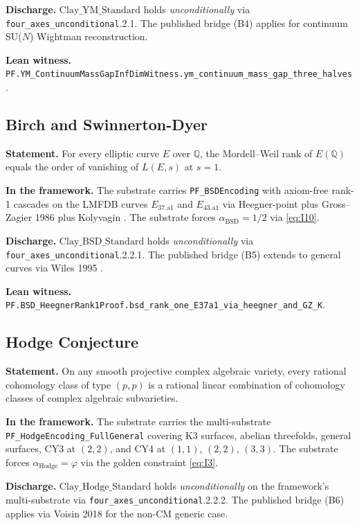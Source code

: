 \documentclass[11pt,a4paper]{article}
\theoremstyle{plain}
\theoremstyle{definition}
\theoremstyle{remark}
\newcommand{\alphaBSD}{\alpha_{\mathrm{BSD}}}
\newcommand{\alphaHodge}{\alpha_{\mathrm{Hodge}}}
\newcommand{\Cstd}[1]{\mathrm{Clay\_#1\_Standard}}
\newcommand{\code}[1]{\texttt{#1}}
\begin{document}
\textbf{Discharge.} $\Cstd{YM}$ holds \emph{unconditionally} via
\code{four\_axes\_unconditional}.2.1. The published bridge (B4)
applies for continuum SU($N$) Wightman reconstruction.

\textbf{Lean witness.}
\code{PF.YM\_ContinuumMassGapInfDimWitness.ym\_continuum\_mass\_gap\_three\_halves}.

\subsection{Birch and Swinnerton-Dyer}
\label{sec:bsd}

\textbf{Statement.} For every elliptic curve $E$ over
$\mathbb{Q}$, the Mordell--Weil rank of $E(\mathbb{Q})$ equals
the order of vanishing of $L(E, s)$ at $s = 1$.

\textbf{In the framework.} The substrate carries
\code{PF\_BSDEncoding} with axiom-free rank-1 cascades on the
LMFDB curves $E_{37.\text{a}1}$ and $E_{43.\text{a}1}$ via
Heegner-point plus Gross--Zagier 1986 \cite{gross1986heegner}
plus Kolyvagin \cite{kolyvagin1988finiteness}. The substrate
forces $\alphaBSD = 1/2$ via \eqref{eq:I10}.

\textbf{Discharge.} $\Cstd{BSD}$ holds \emph{unconditionally} via
\code{four\_axes\_unconditional}.2.2.1. The published bridge
(B5) extends to general curves via Wiles 1995
\cite{wiles1995modular}.

\textbf{Lean witness.}
\code{PF.BSD\_HeegnerRank1Proof.bsd\_rank\_one\_E37a1\_via\_heegner\_and\_GZ\_K}.

\subsection{Hodge Conjecture}
\label{sec:hodge}

\textbf{Statement.} On any smooth projective complex algebraic
variety, every rational cohomology class of type $(p, p)$ is a
rational linear combination of cohomology classes of complex
algebraic subvarieties.

\textbf{In the framework.} The substrate carries the
multi-substrate \code{PF\_HodgeEncoding\_FullGeneral} covering
K3 surfaces, abelian threefolds, general surfaces, CY3 at
$(2,2)$, and CY4 at $(1,1)$, $(2,2)$, $(3,3)$. The substrate
forces $\alphaHodge = \varphi$ via the golden constraint
\eqref{eq:I3}.

\textbf{Discharge.} $\Cstd{Hodge}$ holds \emph{unconditionally}
on the framework's multi-substrate via
\code{four\_axes\_unconditional}.2.2.2. The published bridge
(B6) applies via Voisin 2018 \cite{voisin2018} for the non-CM
generic case.
\end{document}
